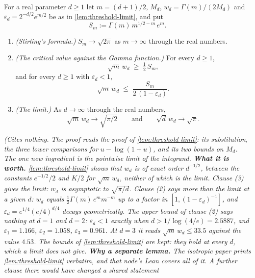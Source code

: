 \begin{lemma}
\label{lem:threshold-asymptotic}
\leanok
For a real parameter $d \ge 1$ let $m = (d+1)/2$, $M_d$, $w_d = \Gamma(m)/(2M_d)$ and
$\varepsilon_d = 2^{-d/2}e^{m/2}$ be as in \ref{lem:threshold-limit}, and put
\[
  S_m := \Gamma(m)\,m^{1/2-m}\,e^{m} .
\]
\begin{enumerate}
\item \emph{(Stirling's formula.)} $S_m \to \sqrt{2\pi}$ as $m \to \infty$ through the real
numbers.
\item \emph{(The critical value against the Gamma function.)} For every $d \ge 1$,
\[
  \sqrt m\,w_d \;\ge\; \tfrac12\,S_m ,
\]
and for every $d \ge 1$ with $\varepsilon_d < 1$,
\[
  \sqrt m\,w_d \;\le\; \frac{S_m}{2\,(1-\varepsilon_d)} .
\]
\item \emph{(The limit.)} As $d \to \infty$ through the real numbers,
\[
  \sqrt m\,w_d \to \sqrt{\pi/2} \qquad\text{and}\qquad \sqrt d\,w_d \to \sqrt\pi .
\]
\end{enumerate}
\statusT\quad\emph{(Cites nothing. The proof reads the proof of \ref{lem:threshold-limit}: its
substitution, the three lower comparisons for $u - \log(1+u)$, and its two bounds on $M_d$. The
one new ingredient is the pointwise limit of the integrand. \textbf{What it is worth.}
\ref{lem:threshold-limit} shows that $w_d$ is of exact order $d^{-1/2}$, between the constants
$e^{-1/2}/2$ and $K/2$ for $\sqrt m\,w_d$, neither of which is the limit. Clause (3) gives the
limit: $w_d$ is asymptotic to $\sqrt{\pi/d}$. Clause (2) says more than the limit at a given $d$:
$w_d$ equals $\tfrac12\Gamma(m)\,e^{m}m^{-m}$ up to a factor in $[1, (1-\varepsilon_d)^{-1}]$, and
$\varepsilon_d = e^{1/4}(e/4)^{d/4}$ decays geometrically. The upper bound of clause (2) says
nothing at $d = 1$ and $d = 2$: $\varepsilon_d < 1$ exactly when $d > 1/\log(4/e) = 2.5887$, and
$\varepsilon_1 = 1.166$, $\varepsilon_2 = 1.058$, $\varepsilon_3 = 0.961$. At $d = 3$ it reads
$\sqrt m\,w_d \le 33.5$ against the value $4.53$. The bounds of
\ref{lem:threshold-limit} are kept: they hold at every $d$, which a limit does not give.
\textbf{Why a separate lemma.} The isotropic paper prints \ref{lem:threshold-limit} verbatim, and
that node's Lean covers all of it. A further clause there would have changed a shared statement
}
\end{lemma}
